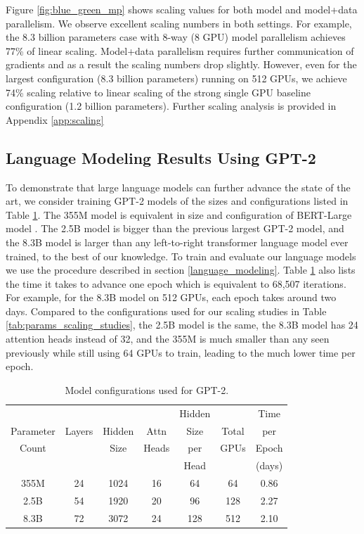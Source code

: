 Figure \ref{fig:blue_green_mp} shows scaling values for both model and model+data parallelism. We observe excellent scaling numbers in both settings. For example, the 8.3 billion parameters case with 8-way (8 GPU) model parallelism achieves 77\% of linear scaling. Model+data parallelism requires further communication of gradients and as a result the scaling numbers drop slightly. However, even for the largest configuration (8.3 billion parameters) running on 512 GPUs, we achieve 74\% scaling relative to linear scaling of the strong single GPU baseline configuration (1.2 billion parameters). Further scaling analysis is provided in Appendix \ref{app:scaling}



\subsection{Language Modeling Results Using GPT-2}
To demonstrate that large language models can further advance the state of the art, we consider training GPT-2 models of the sizes and configurations listed in Table \ref{tab:model_size}. The 355M model is equivalent in size and configuration of BERT-Large model \cite{devlin2018bert}. The 2.5B model is bigger than the previous largest GPT-2 model, and the 8.3B model is larger than any left-to-right transformer language model ever trained, to the best of our knowledge. To train and evaluate our language models we use the procedure described in section \ref{language_modeling}. Table \ref{tab:model_size} also lists the time it takes to advance one epoch which is equivalent to 68,507 iterations. For example, for the 8.3B model on 512 GPUs, each epoch takes around two days. Compared to the configurations used for our scaling studies in Table \ref{tab:params_scaling_studies}, the 2.5B model is the same, the 8.3B model has 24 attention heads instead of 32, and the 355M is much smaller than any seen previously while still using 64 GPUs to train, leading to the much lower time per epoch.

\begin{table}
\footnotesize
\begin{center}
\caption{Model configurations used for GPT-2.}
\label{tab:model_size}
\begin{tabular}{c@{\hskip3pt}|@{\hskip3pt}c@{\hskip3pt}|@{\hskip3pt}c@{\hskip3pt}|@{\hskip3pt}c@{\hskip3pt}|@{\hskip3pt}c@{\hskip3pt}|@{\hskip3pt}c@{\hskip3pt}|@{\hskip3pt}c} \hline \hline
 &  &  &  & Hidden &  & Time \\
Parameter & Layers & Hidden & Attn & Size & Total & per \\
Count &  & Size & Heads & per & GPUs & Epoch \\
 &  &  &  & Head &  & (days) \\ \hline
355M & 24 &  1024 &	16 & 64  &  64  & 0.86  \\ 
2.5B &  54 & 1920 & 20 & 96  &  128 & 2.27  \\ 
8.3B & 72 & 3072 &  24 &  128 & 512 & 2.10   \\ \hline 
\end{tabular}
\end{center}
\end{table}



